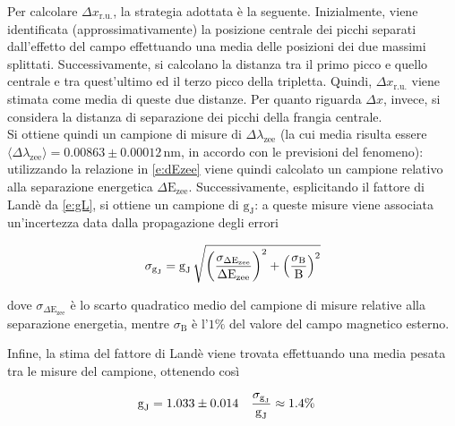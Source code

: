 \documentclass[twocolumn,10pt]{asme2ej}
\begin{document}
Per calcolare $\Delta x_{\text{r.u.}}$, la strategia adottata è la seguente. Inizialmente, viene identificata
(approssimativamente) la posizione centrale dei picchi separati dall'effetto del campo effettuando una media delle
posizioni dei due massimi splittati. Successivamente, si calcolano la distanza tra il primo picco e quello centrale e
tra quest'ultimo ed il terzo picco della tripletta. Quindi, $\Delta x_{\text{r.u.}}$ viene stimata come media di queste
due distanze. Per quanto riguarda $\Delta x$, invece, si considera la distanza di separazione dei picchi della frangia
centrale. \\
Si ottiene quindi un campione di misure di $\Delta\lambda_{\text{zee}}$ (la cui media risulta essere
$\langle\Delta\lambda_{\text{zee}}\rangle = 0.00863 \pm 0.00012 \,\si{\nano\metre}$, in accordo con le previsioni del
fenomeno): utilizzando la relazione in \autoref{e:dEzee} viene quindi calcolato un campione relativo alla separazione
energetica $\Delta \text{E}_{\text{zee}}$. Successivamente, esplicitando il fattore di Landè da \autoref{e:gL}, si
ottiene un campione di $\text{g}_{\text{J}}$: a queste misure viene associata un'incertezza data dalla propagazione
degli errori

\vspace{-15pt}
\begin{equation}
    \sigma_{\text{g}_{\text{J}}} = \text{g}_{\text{J}} \, 
    \sqrt{ 
        \left(\frac{\sigma_{\Delta \text{E}_{\text{zee}}}}{\Delta \text{E}_{\text{zee}}}\right)^2 + 
        \left(\frac{\sigma_{\text{B}}}{\text{B}}\right)^2
        }
    \vspace{-5pt}
\end{equation}

\noindent dove $\sigma_{\Delta \text{E}_{\text{zee}}}$ è lo scarto quadratico medio del campione di misure relative alla
separazione energetia, mentre $\sigma_{\text{B}}$ è l'$1\%$ del valore del campo magnetico esterno. 

Infine, la stima del fattore di Landè viene trovata effettuando una media pesata tra le misure del campione, ottenendo
così 

\vspace{-15pt}
\begin{align*}
    \text{g}_{\text{J}} &= 1.033 \pm 0.014 & \frac{\sigma_{\text{g}_{\text{J}}}}{\text{g}_{\text{J}}} &\approx 1.4\%
    \vspace{-5pt}
\end{align*}
\end{document}
